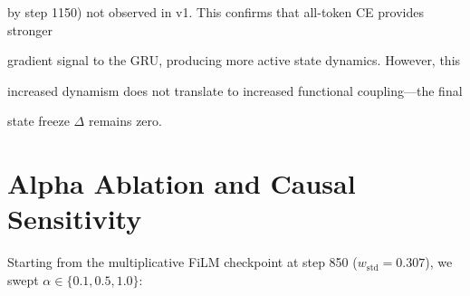 \documentclass[11pt,a4paper]{article}
\begin{document}
by step 1150) not observed in v1. This confirms that all-token CE provides stronger

gradient signal to the GRU, producing more active state dynamics. However, this

increased dynamism does not translate to increased functional coupling---the final

state freeze $\Delta$ remains zero.



\section{Alpha Ablation and Causal Sensitivity}

\label{app:alpha}



Starting from the multiplicative FiLM checkpoint at step 850 ($w_\mathrm{std} =

0.307$), we swept $\alpha \in \{0.1, 0.5, 1.0\}$:
\end{document}
